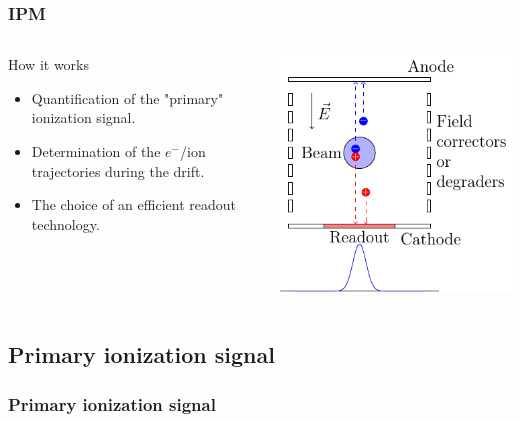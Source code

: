 \begin{frame}
  \frametitle{IPM}
  \begin{columns}
    \begin{column}{0.45\textwidth}
      \begin{block}{How it works}
        \begin{itemize}
          \item Quantification of the "primary" ionization signal.
          \item Determination of the $e^-$/ion trajectories during the drift.
          \item The choice of an efficient readout technology.
        \end{itemize}   
      \end{block}
    \end{column}
    \begin{column}{0.45\textwidth}
      \includegraphics[width=\textwidth]{02_ESS/fig/fig000_IPM.pdf}
    \end{column}
  \end{columns}
\end{frame}

\subsection{Primary ionization signal}
\begin{frame}
  \frametitle{Primary ionization signal}

\end{frame}

